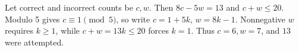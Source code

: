 Let correct and incorrect counts be $c,w$. Then $8c-5w=13$ and $c+w\le20$. Modulo 5 gives $c\equiv1\pmod5$, so write $c=1+5k$, $w=8k-1$. Nonnegative $w$ requires $k\ge1$, while $c+w=13k\le20$ forces $k=1$. Thus $c=6,w=7$, and $\boxed{13}$ were attempted.
